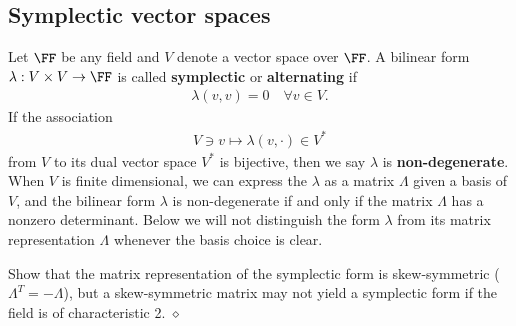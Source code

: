 \subsection{Symplectic vector spaces}

Let $\FF$ be any field and $V$ denote a vector space over $\FF$.
A bilinear form $\lambda : V \times V \to \FF$ is called {\bf symplectic}
or {\bf alternating} if 
\begin{align}
\lambda( v, v ) = 0 \quad \forall v \in V .
\end{align}
If the association
\begin{align}
V \ni v \mapsto \lambda(v, \cdot ) \in V^*
\end{align}
from $V$ to its dual vector space $V^*$
is bijective,
then we say $\lambda$ is {\bf non-degenerate}.
When $V$ is finite dimensional, we can express the $\lambda$ as a matrix $\Lambda$ given a basis of $V$,
and the bilinear form $\lambda$ is non-degenerate if and only if the matrix $\Lambda$ has a nonzero
determinant.
Below we will not distinguish the form $\lambda$ from its matrix representation $\Lambda$
whenever the basis choice is clear.

\begin{exc}
Show that the matrix representation of the symplectic form is skew-symmetric ($\Lambda^T = - \Lambda$),
but a skew-symmetric matrix may not yield a symplectic form if the field is of characteristic 2.
\hfill $\diamond$ \end{exc}


